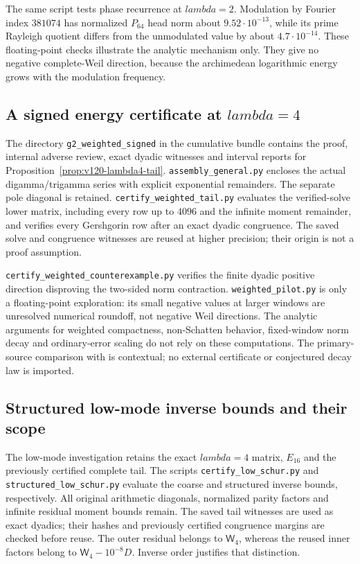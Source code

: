 \documentclass[11pt]{article}
\def\lambda{lambda}%
\theoremstyle{remark}
\begin{document}
The same script tests phase recurrence at $\lambda=2$. Modulation by
Fourier index $381074$ has normalized $P_{64}$ head norm about
$9.52\cdot10^{-13}$, while its prime Rayleigh quotient differs from
the unmodulated value by about $4.7\cdot10^{-14}$.
These floating-point checks illustrate the analytic mechanism only.
They give no negative complete-Weil direction, because the
archimedean logarithmic energy grows with the modulation frequency.

\subsection{A signed energy certificate at \texorpdfstring{$\lambda=4$}{lambda=4}}
The directory \texttt{g2\_weighted\_signed} in the cumulative bundle
contains the proof, internal adverse review, exact dyadic witnesses
and interval reports for Proposition~\ref{prop:v120-lambda4-tail}.
\texttt{assembly\_general.py} encloses the actual digamma/trigamma
series with explicit exponential remainders. The separate pole diagonal
is retained. \texttt{certify\_weighted\_tail.py} evaluates the
verified-solve lower matrix, including every row up to $4096$ and the
infinite moment remainder, and verifies every Gershgorin row after an
exact dyadic congruence. The saved solve and congruence witnesses are
reused at higher precision; their origin is not a proof assumption.

\texttt{certify\_weighted\_counterexample.py} verifies the finite
dyadic positive direction disproving the two-sided norm contraction.
\texttt{weighted\_pilot.py} is only a floating-point exploration:
its small negative values at larger windows are unresolved numerical
roundoff, not negative Weil directions. The analytic arguments for
weighted compactness, non-Schatten behavior, fixed-window norm decay
and ordinary-error scaling do not rely on these computations.
The primary-source comparison with \cite{Zhu2026} is contextual;
no external certificate or conjectured decay law is imported.

\subsection{Structured low-mode inverse bounds and their scope}
The low-mode investigation retains the exact $\lambda=4$ matrix,
$E_{16}$ and the previously certified complete tail. The scripts
\texttt{certify\_low\_schur.py} and
\texttt{structured\_low\_schur.py} evaluate the coarse and structured
inverse bounds, respectively. All original arithmetic diagonals,
normalized parity factors and infinite residual moment bounds remain.
The saved tail witnesses are used as exact dyadics; their hashes and
previously certified congruence margins are checked before reuse.
The outer residual belongs to $\mathsf W_4$, whereas the reused inner
factors belong to $\mathsf W_4-10^{-8}D$. Inverse order justifies
that distinction.
\end{document}
